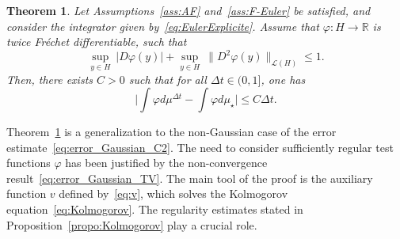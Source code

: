 \documentclass[11pt]{amsart}
\newcommand{\R}{\mathbb{R}}
\newtheorem{theo}{Theorem}[section]
\begin{document}
\begin{theo}\label{theo:order1}
Let Assumptions~\ref{ass:AF} and~\ref{ass:F-Euler} be satisfied, and consider the integrator given by~\eqref{eq:EulerExplicite}. Assume that $\varphi:H\to\R$ is twice Fr\'echet differentiable, such that
\[\underset{y\in H}\sup~|D\varphi(y)|+\underset{y\in H}\sup~\|D^2\varphi(y)\|_{\mathcal{L}(H)}\le 1.\]
%
Then, there exists $C>0$ such that for all $\Delta t\in(0,1]$, one has
\begin{equation}\label{eq:theo-order1}
\big|\int \varphi d\mu^{\Delta t}-\int\varphi d\mu_\star\big|\le C\Delta t.
\end{equation}
\end{theo}

Theorem~\ref{theo:order1} is a generalization to the non-Gaussian case of the error estimate~\eqref{eq:error_Gaussian_C2}. The need to consider sufficiently regular test functions $\varphi$ has been justified by the non-convergence result~\eqref{eq:error_Gaussian_TV}.
%
The main tool of the proof is the auxiliary function $v$ defined by~\eqref{eq:v}, which solves the Kolmogorov equation~\eqref{eq:Kolmogorov}. The regularity estimates stated in Proposition~\ref{propo:Kolmogorov} play a crucial role.
\end{document}
